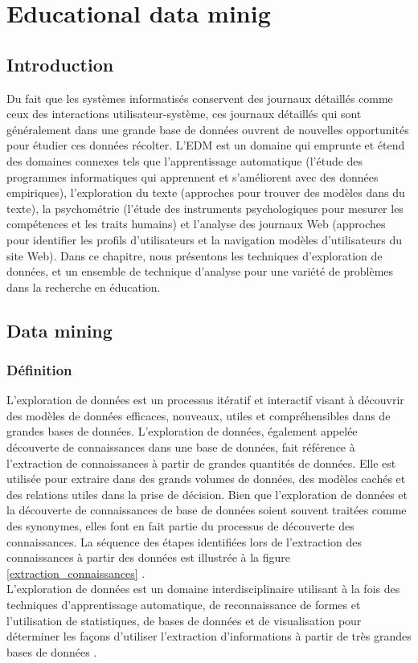 \chapter{Educational data minig}\label{chap1}
\minitoc
\thispagestyle{empty}
\newpage	
	
\section{Introduction}
Du fait que les systèmes informatisés conservent des journaux détaillés comme ceux des interactions utilisateur-système, ces journaux détaillés qui sont généralement dans une grande base de données ouvrent de nouvelles opportunités pour étudier ces données récolter. L’EDM est un domaine qui emprunte et étend des domaines connexes tels que l’apprentissage automatique (l’étude des programmes informatiques qui apprennent et s’améliorent avec des données empiriques), l’exploration du texte (approches pour trouver des modèles dans du texte), la psychométrie (l’étude des instruments psychologiques pour mesurer les compétences et les traits humains) et l’analyse des journaux Web (approches pour identifier les profils d’utilisateurs et la navigation modèles d’utilisateurs du site Web). Dans ce chapitre, nous présentons les techniques d’exploration de données, et un ensemble de technique d’analyse pour une variété de problèmes dans la recherche en éducation.\\

\section{Data mining}

\subsection{Définition}
L'exploration de données est un processus itératif et interactif visant à découvrir des modèles de données efficaces, nouveaux, utiles et compréhensibles dans de grandes bases de données. L'exploration de données, également appelée découverte de connaissances dans une base de données, fait référence à l'extraction de connaissances à partir de grandes quantités de données. Elle est utilisée pour extraire dans des grands volumes de données, des modèles cachés et des relations utiles dans la prise de décision. Bien que l'exploration de données et la découverte de connaissances de base de données soient souvent traitées comme des synonymes, elles font en fait partie du processus de découverte des connaissances. La séquence des étapes identifiées lors de l'extraction des connaissances à partir des données est illustrée à la figure \ref{extraction_connaissances} \cite{data_mining_concepts_techniques}.  \\
L'exploration de données est un domaine interdisciplinaire utilisant à la fois des techniques d'apprentissage automatique, de reconnaissance de formes et l'utilisation de statistiques, de bases de données et de visualisation pour déterminer les façons d'utiliser l'extraction d'informations à partir de très grandes bases de données \cite{cabena1998discovering}.

